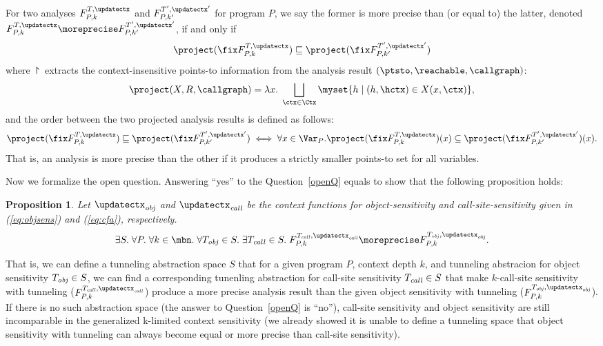  For two analyses $F_{P,k}^{T, \updatectx}$ and
 $F_{P,k'}^{T',\updatectx'}$ for program $P$, we say the former is more
 precise than (or equal to) the
 latter, denoted $F_{P,k}^{T, \updatectx} \moreprecise F_{P,k'}^{T', \updatectx'}$, if and only if
 \[
   \project(\fix F_{P,k}^{T, \updatectx}) \sqsubseteq \project(\fix F_{P,k'}^{T', \updatectx'})
 \]
 where $\project$ extracts the context-insensitive points-to
 information from the analysis result $(\ptsto, \reachable,\callgraph)$:
 \begin{equation}\label{eq:project}
 \project(X, R,\callgraph) = \lambda x.\; \bigsqcup_{\ctx \in \Ctx}
 \myset{h \mid (h, \hctx) \in X(x, \ctx)},
 \end{equation}
and the order between the two projected analysis results is defined as follows:
 \[
   \project(\fix F_{P,k}^{T, \updatectx}) \sqsubseteq \project(\fix
   F_{P,k'}^{T', \updatectx'}) \iff \forall x\in \Var_P. \project(\fix
   F_{P,k}^{T, \updatectx})(x) \subseteq \project(\fix
   F_{P,k'}^{T', \updatectx'}) (x).
 \]
That is, an analysis is more precise than the other if it produces
a strictly smaller points-to set for all variables.


Now we formalize the open question. 
Answering ``yes'' to the {\sc Question~\ref{openQ}} equals to show that the
following proposition holds:
\newtheorem{prop}{Proposition}
\begin{prop}
Let $\updatectx_{\it obj}$
and $\updatectx_{\it call}$ be the context functions for
object-sensitivity and call-site-sensitivity given in
(\ref{eq:objsens}) and (\ref{eq:cfa}), respectively. 
\begin{equation}\label{eq:conjecture}
\exists S. \; \forall P. \; \forall k\in \mbn. \; \forall T_{\it obj}\in S. \; \exists
T_{\it call} \in S. \; 
F_{P,k}^{T_{\it call},\updatectx_{{\it call}}}
\moreprecise F_{P,k}^{T_{\it obj}, \updatectx_{{\it obj}}}.
\end{equation}
\label{conjecture}
\end{prop}
That is, we can define a tunneling abstraction space $S$ that
for a given program $P$, context depth $k$, and tunneling abstracion for
object sensitivity $T_{\it obj} \in S$, we can find a
corresponding tunenling abstraction for call-site sensitivity $T_{\it
  call} \in S$ that make $k$-call-site sensitivity with tunneling
($F_{P,k}^{T_{\it call},\updatectx_{{\it call}}}$) produce a more
precise analysis result than the
given object sensitivity with tunneling ($F_{P,k}^{T_{\it obj},
  \updatectx_{{\it obj}}}$).
If there is no such abstraction space (the answer to {\sc
  Question~\ref{openQ}} is ``no''), call-site sensitivity and 
object sensitivity are still incomparable in the generalized
k-limited context sensitivity
(we already showed it is unable to define a
tunneling space that 
object sensitivity with tunneling can always become equal or more
precise than call-site sensitivity). 


